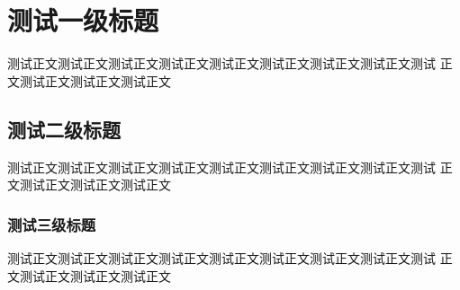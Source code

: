 \transbody
\section{测试一级标题}
测试正文测试正文测试正文测试正文测试正文测试正文测试正文测试正文测试
正文测试正文测试正文测试正文
\subsection{测试二级标题}
测试正文测试正文测试正文测试正文测试正文测试正文测试正文测试正文测试
正文测试正文测试正文测试正文
\subsubsection{测试三级标题}
测试正文测试正文测试正文测试正文测试正文测试正文测试正文测试正文测试
正文测试正文测试正文测试正文
